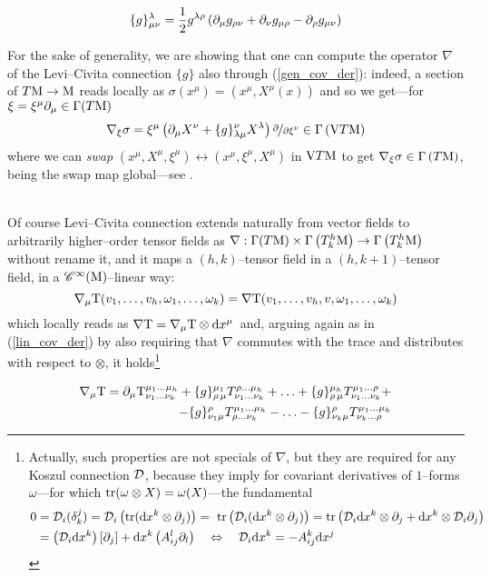 \begin{equation}\label{chrystoffels}
\{g\}^\lambda_{\mu\nu}=\frac{1}{2}g^{\lambda\rho}\left(\partial_\mu g_{\rho\nu}+\partial_\nu g_{\mu\rho}-\partial_\rho g_{\mu\nu}\right)    
\end{equation}

For the sake of generality, we are showing that one can compute the operator $\nabla$ of the Levi--Civita connection $\{g\}$ also through (\ref{gen_cov_der}): indeed, a section of $T\text{\normalfont M}\to\text{\normalfont M}$ reads locally as $\sigma(x^\mu)=(x^\mu,X^\mu(x))$ and so we get---for $\xi=\xi^\mu\partial_\mu\in\Gamma(T\text{\normalfont M})$ 
$$\nabla_\xi\sigma=\xi^\mu\left(\partial_\mu X^\nu+\{g\}^\nu_{\lambda\mu}X^\lambda\right)\nicefrac{\partial}{\partial\xi^\nu}\in\Gamma\left(\text{\normalfont V} T\text{\normalfont M}\right)$$
where we can \emph{swap} $(x^\mu,X^\mu,\xi^\mu)\leftrightarrow(x^\mu,\xi^\mu,X^\mu)$ in $\text{\normalfont V} T\text{\normalfont M}$ to get $\nabla_\xi\sigma\in\Gamma\left(T\text{\normalfont M}\right)$, being the swap map global---see \cite{fatib}.\\
\,\newline

Of course Levi--Civita connection extends naturally from vector fields to arbitrarily higher--order tensor fields as $\nabla:\Gamma(T\text{\normalfont M})\times\Gamma\left(T^h_k\text{\normalfont M}\right)\to\Gamma\left(T^h_k\text{\normalfont M}\right)$ without rename it, and it maps a $(h,k)$--tensor field in a $(h,k+1)$--tensor field, in a $\mathscr{C}^\infty(\text{\normalfont M})$--linear way:
$$\nabla_\mu\text{\normalfont T}(v_1,\hdots,v_h,\omega_1,\hdots,\omega_k)=\nabla\text{\normalfont T}(v_1,\hdots,v_h, v, \omega_1,\hdots,\omega_k)$$
which locally reads as $\nabla\text{\normalfont T}=\nabla_\mu\text{\normalfont T}\otimes\text{\normalfont d} x^\mu$\, and, arguing again as in (\ref{lin_cov_der}) by also requiring that $\nabla$ commutes with the trace and distributes with respect to $\otimes$, it holds\footnote{Actually, such properties are not specials of $\nabla$, but they are required for any Koszul connection $\mathcal{D}$, because they imply for covariant derivatives of $1$--forms $\omega$---for which $\text{\normalfont tr}(\omega\otimes X)=\omega(X)$---the fundamental
\begin{align*}
    0&=\mathcal{D}_i(\delta^j_k)=\mathcal{D}_i\left(\text{\normalfont tr}(\text{\normalfont d} x^k\otimes\partial_j)\right)=\,\,\text{\normalfont tr}\left(\mathcal{D}_i(\text{\normalfont d} x^k\otimes\partial_j)\right)=\text{\normalfont tr}\left(\mathcal{D}_i\text{\normalfont d} x^k\otimes\partial_j+\text{\normalfont d} x^k\otimes\mathcal{D}_i\partial_j\right)\\
    &=\left(\mathcal{D}_i\text{\normalfont d} x^k\right)[\partial_j]+\text{\normalfont d} x^k\left(A_{ij}^l\partial_l\right)\quad\Leftrightarrow\quad \mathcal{D}_i\text{\normalfont d} x^k=-A^k_{ij}\text{\normalfont d} x^j
\end{align*}
}

\begin{equation}\label{tensor_cov_der}
\begin{split}
    \nabla_\mu\text{\normalfont T}=\partial_\mu\text{\normalfont T}^{\mu_1\hdots\mu_h}_{\nu_1\hdots\nu_k}+\{g\}^{\mu_1}_{\rho\,\mu}T^{\rho\hdots\mu_h}_{\nu_1\hdots\nu_k}+\hdots+\{g\}^{\mu_h}_{\rho\,\mu}T^{\mu_1\hdots\rho}_{\nu_1\hdots\nu_k}+\\
    -\{g\}^\rho_{\nu_1\mu}T^{\mu_1\hdots\mu_h}_{\rho\hdots\nu_k}-\hdots-\{g\}^\rho_{\nu_k\mu}T^{\mu_1\hdots\mu_h}_{\nu_k\hdots\rho}
\end{split}
\end{equation}

